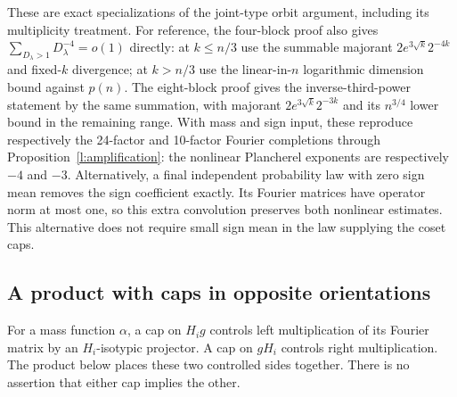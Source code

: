 These are exact specializations of the joint-type orbit argument,
including its multiplicity treatment.  For reference, the four-block
proof also gives $\sum_{D_\lambda>1}D_\lambda^{-4}=o(1)$ directly:
at $k\le n/3$ use the summable majorant
$2e^{3\sqrt k}2^{-4k}$ and fixed-$k$ divergence; at $k>n/3$
use the linear-in-$n$ logarithmic dimension bound against $p(n)$.
The eight-block proof gives the inverse-third-power statement by
the same summation, with majorant $2e^{3\sqrt k}2^{-3k}$ and its
$n^{3/4}$ lower bound in the remaining range.  With mass and sign
input, these reproduce respectively the 24-factor and 10-factor
Fourier completions through Proposition~\ref{l:amplification}:
the nonlinear Plancherel exponents are respectively $-4$ and $-3$.
Alternatively, a final independent probability law with zero sign
mean removes the sign coefficient exactly.  Its Fourier matrices
have operator norm at most one, so this extra convolution preserves
both nonlinear estimates.  This alternative does not require small
sign mean in the law supplying the coset caps.

\subsection{A product with caps in opposite orientations}

For a mass function $\alpha$, a cap on $H_i g$ controls left
multiplication of its Fourier matrix by an $H_i$-isotypic projector.
A cap on $gH_i$ controls right multiplication.  The product below
places these two controlled sides together.  There is no assertion
that either cap implies the other.


